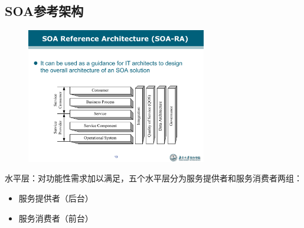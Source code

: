 \vspace{-1em}

\subsection{SOA参考架构}
\begin{figure}[H]
    \vspace{-0.5em}
	\centering
	\includegraphics[width=0.7\textwidth]{images/SOA参考架构.pdf}
    \vspace{-1em}
\end{figure}

水平层：对功能性需求加以满足，五个水平层分为服务提供者和服务消费者两组：
\begin{itemize}
    \item 服务提供者（后台）
\end{itemize}
\begin{spacing}{1.2}
    
    \vspace{-2.5em}
\end{spacing}

\begin{itemize}
    \item 服务消费者（前台）
\end{itemize}

\begin{spacing}{1.15}
    
    \vspace{-1em}
\end{spacing}

